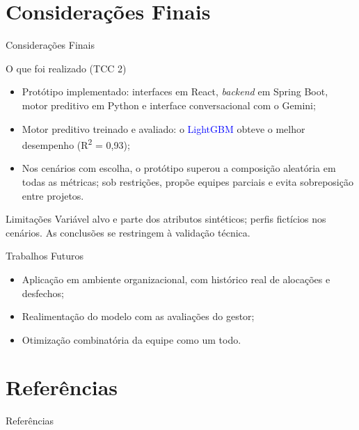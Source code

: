 \documentclass{beamer}
\begin{document}
\section{Considerações Finais}
\begin{frame}[allowframebreaks]{Considerações Finais}
    \begin{block}{O que foi realizado (TCC 2)}
    \begin{itemize}
        \item Protótipo implementado: interfaces em React, \textit{backend} em Spring Boot, motor preditivo em Python e interface conversacional com o Gemini;
        \vspace{0.2cm}

        \item Motor preditivo treinado e avaliado: o \textcolor{blue}{LightGBM} obteve o melhor desempenho (R\textsuperscript{2} = 0,93);
        \vspace{0.2cm}

        \item Nos cenários com escolha, o protótipo superou a composição aleatória em todas as métricas; sob restrições, propõe equipes parciais e evita sobreposição entre projetos.
    \end{itemize}
    \end{block}

    \framebreak

    \begin{block}{Limitações}
        Variável alvo e parte dos atributos sintéticos; perfis fictícios nos cenários. As conclusões se restringem à validação técnica.
    \end{block}

    \begin{block}{Trabalhos Futuros}
        \begin{itemize}
            \item Aplicação em ambiente organizacional, com histórico real de alocações e desfechos;
            \item Realimentação do modelo com as avaliações do gestor;
            \item Otimização combinatória da equipe como um todo.
        \end{itemize}
    \end{block}

\end{frame}

\section{Referências}
\begin{frame}[allowframebreaks]{Referências}
    \nocite{*}
    
    
\end{frame}
\end{document}
